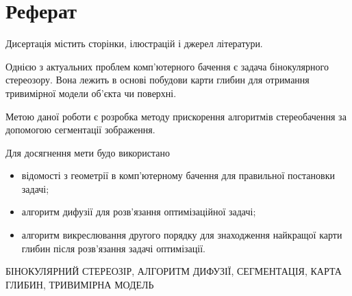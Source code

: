 \chapter*{Реферат}

Дисертація містить \pageref{LastPage} сторінки,
 ілюстрацій і
 джерел літератури.

Однією з актуальних проблем комп'ютерного бачення
є задача бінокулярного стереозору.
Вона лежить в основі побудови карти глибин
для отримання тривимірної модели об'єкта чи поверхні.

Метою даної роботи є розробка методу прискорення алгоритмів стереобачення
за допомогою сегментації зображення.

Для досягнення мети будо використано
\begin{itemize}
  \item відомості з геометрії в комп'ютерному бачення
        для правильної постановки задачі;
  \item алгоритм дифузії для розв'язання оптимізаційної задачі;
  \item алгоритм викреслювання другого порядку для знаходження
        найкращої карти глибин після розв'язання задачі оптимізації.
\end{itemize}

\MakeUppercase{бінокулярний стереозір,
               алгоритм дифузії,
               сегментація,
               карта глибин,
               тривимірна модель}
